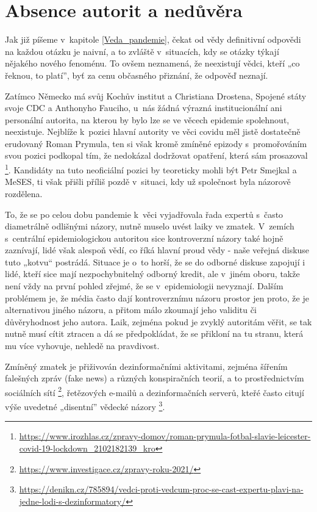 \section*{Absence autorit a nedůvěra}

Jak již píšeme v~kapitole \ref{Veda_pandemie}, čekat od vědy definitivní odpovědi na každou otázku je naivní, a to zvláště v~situacích, kdy se otázky týkají nějakého nového fenoménu. To ovšem neznamená, že neexistují vědci, kteří „co řeknou, to platí”, byť za cenu občasného přiznání, že odpověď neznají. 

Zatímco Německo má svůj Kochův institut a Christiana Drostena, Spojené státy svoje CDC a Anthonyho Fauciho, u~nás žádná výrazná institucionální ani personální autorita, na kterou by bylo lze se ve věcech epidemie spolehnout, neexistuje. Nejblíže k~pozici hlavní autority ve věci covidu měl jistě dostatečně erudovaný Roman Prymula, ten si však kromě zmíněné epizody s~promořováním svou pozici podkopal tím, že nedokázal dodržovat opatření, která sám prosazoval \footnote{\url{https://www.irozhlas.cz/zpravy-domov/roman-prymula-fotbal-slavie-leicester-covid-19-lockdown_2102182139_kro}}. Kandidáty na tuto neoficiální pozici by teoreticky mohli být Petr Smejkal a MeSES, ti však přišli příliš pozdě v~situaci, kdy už společnost byla názorově rozdělena.

To, že se po celou dobu pandemie k~věci vyjadřovala řada expertů s~často diametrálně odlišnými názory, nutně muselo uvést laiky ve zmatek. V~zemích s~centrální epidemiologickou autoritou sice kontroverzní názory také hojně zaznívají, lidé však alespoň vědí, co říká hlavní proud vědy - naše veřejná diskuse tuto „kotvu“ postrádá. Situace je o~to horší, že se do odborné diskuse zapojují i lidé, kteří sice mají nezpochybnitelný odborný kredit, ale v~jiném oboru, takže není vždy na první pohled zřejmé, že se v~epidemiologii nevyznají. Dalším problémem je, že média často dají kontroverznímu názoru prostor jen proto, že je alternativou jiného názoru, a přitom málo zkoumají jeho validitu či důvěryhodnost jeho autora. Laik, zejména pokud je zvyklý autoritám věřit, se tak nutně musí cítit ztracen a dá se předpokládat, že se přikloní na tu stranu, která mu více vyhovuje, nehledě na pravdivost.

Zmíněný zmatek je přiživován dezinformačními aktivitami, zejména šířením fa\-leš\-ných zpráv (fake news) a různých konspiračních teorií, a to prostřednictvím sociálních sítí \footnote{\url{https://www.investigace.cz/zpravy-roku-2021/}}, řetězových e-mailů a dezinformačních serverů, kteřé často citují výše uvedetné „disentní” vědecké názory \footnote{\url{https://denikn.cz/785894/vedci-proti-vedcum-proc-se-cast-expertu-plavi-na-jedne-lodi-s-dezinformatory/}}.

